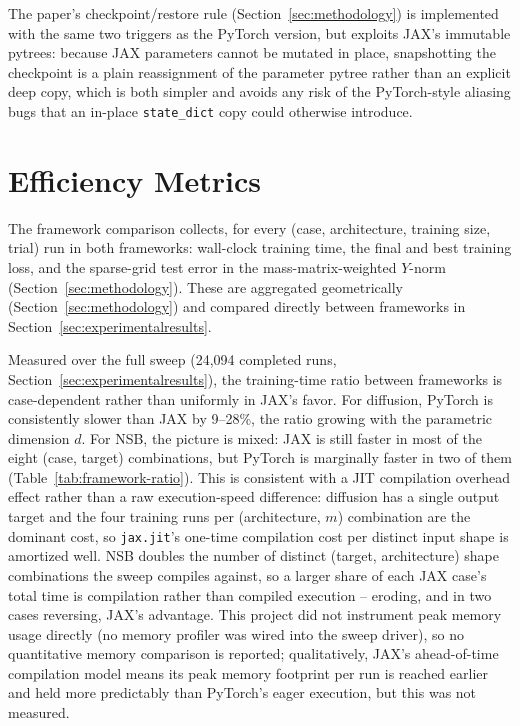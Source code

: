 The paper's checkpoint/restore rule (Section~\ref{sec:methodology}) is
implemented with the same two triggers as the PyTorch version, but exploits
JAX's immutable pytrees: because JAX parameters cannot be mutated in
place, snapshotting the checkpoint is a plain reassignment of the
parameter pytree rather than an explicit deep copy, which is both simpler
and avoids any risk of the PyTorch-style aliasing bugs that an in-place
\texttt{state\_dict} copy could otherwise introduce.

\section{Efficiency Metrics}

The framework comparison collects, for every (case, architecture, training
size, trial) run in both frameworks: wall-clock training time, the final
and best training loss, and the sparse-grid test error in the
mass-matrix-weighted $Y$-norm (Section~\ref{sec:methodology}). These are
aggregated geometrically (Section~\ref{sec:methodology}) and compared
directly between frameworks in
Section~\ref{sec:experimentalresults}.

Measured over the full sweep (24{,}094 completed runs,
Section~\ref{sec:experimentalresults}), the training-time ratio between
frameworks is case-dependent rather than uniformly in JAX's favor. For
diffusion, PyTorch is consistently slower than JAX by 9--28\%, the ratio
growing with the parametric dimension $d$. For NSB, the picture is mixed:
JAX is still faster in most of the eight (case, target) combinations, but
PyTorch is marginally faster in two of them
(Table~\ref{tab:framework-ratio}). This is consistent with a JIT
compilation overhead effect rather than a raw execution-speed difference:
diffusion has a single output target and the four training runs per
(architecture, $m$) combination are the dominant cost, so \texttt{jax.jit}'s
one-time compilation cost per distinct input shape is amortized well. NSB
doubles the number of distinct (target, architecture) shape combinations
the sweep compiles against, so a larger share of each JAX case's total time
is compilation rather than compiled execution -- eroding, and in two cases
reversing, JAX's advantage. This project did not instrument peak memory
usage directly (no memory profiler was wired into the sweep driver), so no
quantitative memory comparison is reported; qualitatively, JAX's
ahead-of-time compilation model means its peak memory footprint per run is
reached earlier and held more predictably than PyTorch's eager execution,
but this was not measured.

